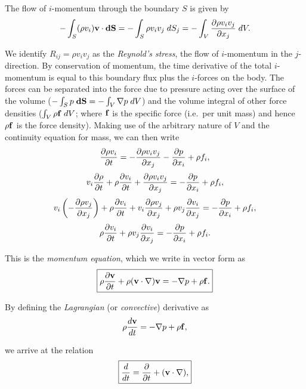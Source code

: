 \documentclass[../ay202_class_notes.tex]{subfiles}
\begin{document}
\noindent The flow of $i$-momentum through the boundary $S$ is given by
\begin{equation}
- \int_{S} (\rho v_i) \mathbf{v} \cdot \mathbf{dS} = - \int_{S} \rho v_i v_j \;dS_j = - \int_{V} \frac{\partial \rho v_i v_j}{\partial x_j} \;dV.
\end{equation}

\noindent We identify $R_{ij} = \rho v_i v_j$ as the \emph{Reynold's stress}, the flow of $i$-momentum in the $j$-direction.  By conservation of momentum, the time derivative of the total $i$-momentum is equal to this boundary flux plus the $i$-forces on the body.  The forces can be separated into the force due to pressure acting over the surface of the volume ($-\int_{S} p \;\mathbf{dS} = - \int_{V} \nabla p \;dV$) and the volume integral of other force densities ($\int_{V} \rho \mathbf{f} \;dV$; where $\mathbf{f}$ is the specific force (i.e.~per unit mass) and hence $\rho \mathbf{f}$ is the force density).  Making use of the arbitrary nature of $V$ and the continuity equation for mass, we can then write
\begin{equation}
\frac{\partial \rho v_i}{\partial t} = -\frac{\partial \rho v_i v_j}{\partial x_j} - \frac{\partial p}{\partial x_i} + \rho f_i,
\end{equation}
\begin{equation}
v_i \frac{\partial \rho}{\partial t} + \rho \frac{\partial v_i}{\partial t} + \frac{\partial \rho v_i v_j}{\partial x_j} = - \frac{\partial p}{\partial x_i} + \rho f_i,
\end{equation}
\begin{equation}
v_i \left(-\frac{\partial \rho v_j}{\partial x_j}\right) + \rho \frac{\partial v_i}{\partial t} + v_i \frac{\partial \rho v_j}{\partial x_j} + \rho v_j \frac{\partial v_i}{\partial x_j} = - \frac{\partial p}{\partial x_i} + \rho f_i,
\end{equation}
\begin{equation}
\rho \frac{\partial v_i}{\partial t} + \rho v_j \frac{\partial v_i}{\partial x_j} = - \frac{\partial p}{\partial x_i} + \rho f_i.
\end{equation}

\noindent This is the \emph{momentum equation}, which we write in vector form as
\begin{equation}
\boxed{\rho \frac{\partial \mathbf{v}}{\partial t} + \rho (\mathbf{v} \cdot \nabla) \mathbf{v} = - \nabla p + \rho \mathbf{f}.}
\end{equation}

By defining the \emph{Lagrangian} (or \emph{convective}) derivative as 
\begin{equation}
\rho \frac{d \mathbf{v}}{d t} = - \nabla p + \rho \mathbf{f},
\end{equation}

\noindent we arrive at the relation
\begin{equation}
\boxed{\frac{d }{d t} = \frac{\partial }{\partial t} + (\mathbf{v} \cdot \nabla),}
\end{equation}
\end{document}
